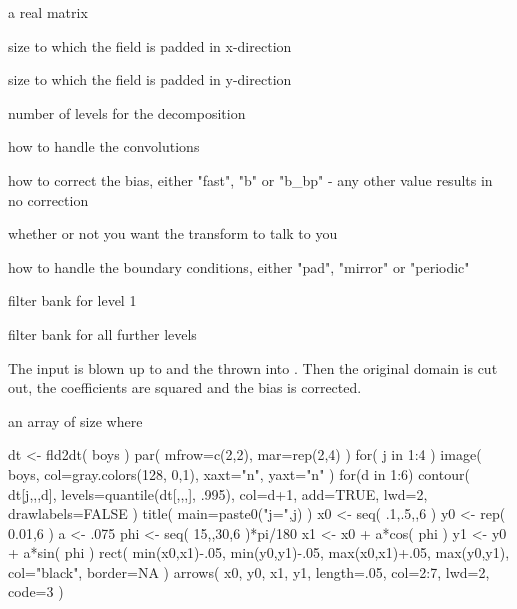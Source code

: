 \documentclass[a4paper]{book}
\begin{document}
\begin{Arguments}
\begin{ldescription}
\item[\code{fld}] a real matrix

\item[\code{Nx}] size to which the field is padded in x-direction

\item[\code{Ny}] size to which the field is padded in y-direction

\item[\code{J}] number of levels for the decomposition

\item[\code{mode}] how to handle the convolutions

\item[\code{correct}] how to correct the bias, either "fast", "b" or "b\_bp" - any other value results in no correction

\item[\code{verbose}] whether or not you want the transform to talk to you

\item[\code{boundary}] how to handle the boundary conditions, either "pad", "mirror" or "periodic"

\item[\code{fb1}] filter bank for level 1

\item[\code{fb2}] filter bank for all further levels
\end{ldescription}
\end{Arguments}
%
\begin{Details}\relax
The input is blown up to  and the thrown into . Then the original domain is cut out, the coefficients are squared and the bias is corrected.
\end{Details}
%
\begin{Value}
an array of size  where 
\end{Value}
%
\begin{SeeAlso}\relax
{}
\end{SeeAlso}
%
\begin{Examples}
\begin{ExampleCode}
dt <- fld2dt( boys )
par( mfrow=c(2,2), mar=rep(2,4) )
for( j in 1:4 ){
    image( boys, col=gray.colors(128, 0,1), xaxt="n", yaxt="n" )
    for(d in  1:6) contour( dt[j,,,d], levels=quantile(dt[,,,], .995), 
                            col=d+1, add=TRUE, lwd=2, drawlabels=FALSE )
    title( main=paste0("j=",j) )
} 
x0  <- seq( .1,.5,,6 )
y0  <- rep( 0.01,6 )
a   <- .075
phi <- seq( 15,,30,6 )*pi/180
x1  <- x0 + a*cos( phi )
y1  <- y0 + a*sin( phi )
rect( min(x0,x1)-.05, min(y0,y1)-.05, 
      max(x0,x1)+.05, max(y0,y1), col="black", border=NA )
arrows( x0, y0, x1, y1, length=.05, col=2:7, lwd=2, code=3 )
\end{ExampleCode}
\end{Examples}
\end{document}
